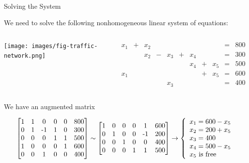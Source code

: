 \documentclass[xcolor=dvipsnames,aspectratio=169,t]{beamer}
\begin{document}
\begin{frame}{Solving the System}

  We need to solve the following nonhomogeneous linear system of equations:

  \begin{columns}[T]
    \column{0.3\tw}

    \texttt{[image: images/fig-traffic-network.png]}
    
      \column{0.7\tw}
\[   \begin{array}{ccccccccccc}
    x_1 & + & x_2 &   &         &    &        &   &          &= & 800\\
           &     & x_2 & - & x_3 & + & x_4 &   &         &=& 300\\
           &     &        &    &        &    & x_4 & + & x_5 &=& 500\\
    x_1 &     &        &    &       &     &        & + & x_5 &=& 600\\
           &      &        &   & x_3 &    &        &     &        &=& 400
\end{array} \]

\end{columns}

   We have an augmented matrix

   \[ \bbm
   $1$ & $1$ & $0$ & $0$ & $0$ & $800$\\
   $0$ & $1$ & $-1$ & $1$ & $0$ & $300$\\
   $0$ & $0$ & $0$ & $1$ & $1$ & $500$\\
   $1$ & $0$ & $0$ & $0$ & $1$ & $600$\\
   $0$ & $0$ & $1$ & $0$ & $0$ & $400$
   \ebm
   \sim
   \bbm
   $1$ & $0$ & $0$ & $0$ & $1$ & $600$\\
   $0$ & $1$ & $0$ & $0$ & $-1$ & $200$\\
   $0$ & $0$ & $1$ & $0$ & $0$ & $400$\\
   $0$ & $0$ & $0$ & $1$ & $1$ & $500$\\
   \ebm
   \rightarrow
   \left\{ \begin{array}{l}
     x_1=600-x_5\\
     x_2 = 200 + x_5\\
     x_3 = 400\\
     x_4 = 500-x_5\\
     x_5 \mbox{ is free}
     \end{array} \right.
   \]

\end{frame}

  
\end{document}
